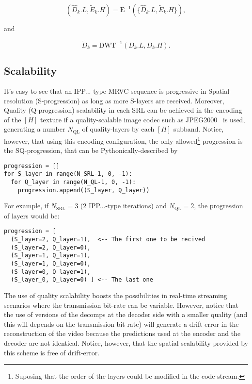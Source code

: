 \begin{equation}
  (\hat{D}_k.L, \tilde{E}_k.H) = \text{E}^{-1}(\{\hat{D}_k.L, \tilde{E}_k.H\}),
  \tag{q}
\end{equation}

and

\begin{equation}
  \tilde{D}_k = \text{DWT}^{-1}(D_k.L, D_k.H).
  \tag{r}
\end{equation}

\subsection{Scalability}
It's easy to see that an IPP...-type MRVC sequence is progressive in
Spatial-resolution (S-progression) as long as more S-layers are
received. Moreover, Quality (Q-progression) scalability in each SRL
can be achieved in the encoding of the $[H]$ texture if a
quality-scalable image codec such as
JPEG2000~\cite{taubman2002jpeg2000} is used, generating a number
$N_{\text{QL}}$ of quality-layers by each $[H]$ subband. Notice,
however, that using this encoding configuration, the only
allowed\footnote{Suposing that the order of the layers could be
modified in the code-stream.} progression is the SQ-progression, that
can be Pythonically-described by
\begin{verbatim}
progression = []
for S_layer in range(N_SRL-1, 0, -1):
  for Q_layer in range(N_QL-1, 0, -1):
    progression.append((S_layer, Q_layer))
\end{verbatim}

For example, if $N_{\text{SRL}}=3$ (2 IPP...-type iterations) and
$N_{\text{QL}}=2$, the progression of layers would be:
\begin{verbatim}
progression = [
  (S_layer=2, Q_layer=1),  <-- The first one to be recived
  (S_layer=2, Q_layer=0),
  (S_layer=1, Q_layer=1),
  (S_layer=1, Q_layer=0),
  (S_layer=0, Q_layer=1),
  (S_layer_0, Q_layer=0) ] <-- The last one
\end{verbatim}

The use of quality scalability boosts the possibilities in real-time
streaming scenarios where the transmission bit-rate can be
variable. However, notice that the use of versions of the decomps at
the decoder side with a smaller quality (and this will depends on the
transmission bit-rate) will generate a drift-error in the
reconstruction of the video because the predictions used at the
encoder and the decoder are not identical. Notice, however, that the
spatial scalability provided by this scheme is free of drift-error.

